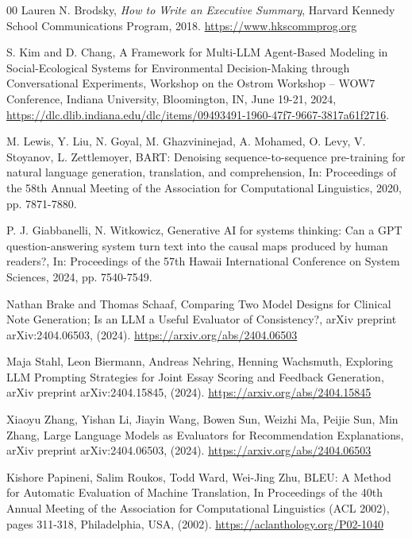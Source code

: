 \documentclass[preprint,12pt]{elsarticle}
\begin{document}
\begin{thebibliography}{00}
Lauren N. Brodsky,
\textit{How to Write an Executive Summary},
Harvard Kennedy School Communications Program, 2018.
\href{https://www.hkscommprog.org}{https://www.hkscommprog.org}


S. Kim and D. Chang,
A Framework for Multi-LLM Agent-Based Modeling in Social-Ecological Systems for Environmental Decision-Making through Conversational Experiments,
Workshop on the Ostrom Workshop – WOW7 Conference, Indiana University, Bloomington, IN, June 19-21, 2024,
\href{https://dlc.dlib.indiana.edu/dlc/items/09493491-1960-47f7-9667-3817a61f2716}{https://dlc.dlib.indiana.edu/dlc/items/09493491-1960-47f7-9667-3817a61f2716}.


M. Lewis, Y. Liu, N. Goyal, M. Ghazvininejad, A. Mohamed, O. Levy, V. Stoyanov, L. Zettlemoyer,
BART: Denoising sequence-to-sequence pre-training for natural language generation, translation, and comprehension,
In: Proceedings of the 58th Annual Meeting of the Association for Computational Linguistics, 2020, pp. 7871-7880.

P. J. Giabbanelli, N. Witkowicz,
Generative AI for systems thinking: Can a GPT question-answering system turn text into the causal maps produced by human readers?,
In: Proceedings of the 57th Hawaii International Conference on System Sciences, 2024, pp. 7540-7549.

Nathan Brake and Thomas Schaaf,
Comparing Two Model Designs for Clinical Note Generation; Is an LLM a Useful Evaluator of Consistency?,
arXiv preprint arXiv:2404.06503, (2024).
\href{https://arxiv.org/abs/2404.06503}{https://arxiv.org/abs/2404.06503}

Maja Stahl, Leon Biermann, Andreas Nehring, Henning Wachsmuth,
Exploring LLM Prompting Strategies for Joint Essay Scoring and Feedback Generation,
arXiv preprint arXiv:2404.15845, (2024).
\href{https://arxiv.org/abs/2404.15845}{https://arxiv.org/abs/2404.15845}


Xiaoyu Zhang, Yishan Li, Jiayin Wang, Bowen Sun, Weizhi Ma, Peijie Sun, Min Zhang,
Large Language Models as Evaluators for Recommendation Explanations,
arXiv preprint arXiv:2404.06503, (2024).
\href{https://arxiv.org/abs/2404.06503}{https://arxiv.org/abs/2404.06503}

Kishore Papineni, Salim Roukos, Todd Ward, Wei-Jing Zhu,
BLEU: A Method for Automatic Evaluation of Machine Translation,
In Proceedings of the 40th Annual Meeting of the Association for Computational Linguistics (ACL 2002), pages 311-318, Philadelphia, USA, (2002).
\href{https://aclanthology.org/P02-1040}{https://aclanthology.org/P02-1040}


\end{thebibliography}
\end{document}
